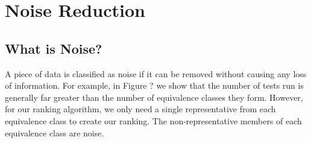 \documentclass[11pt,twoside]{article}
\begin{document}

\section{Noise Reduction}

\subsection{What is Noise?}
A piece of data is classified as noise if it can be removed without causing any loss of information. For example, in Figure {?} we show that the number of tests run is generally far greater than the number of equivalence classes they form. However, for our ranking algorithm, we only need a single representative from each equivalence class to create our ranking. The non-representative members of each equivalence class are noise. 
\end{document}
